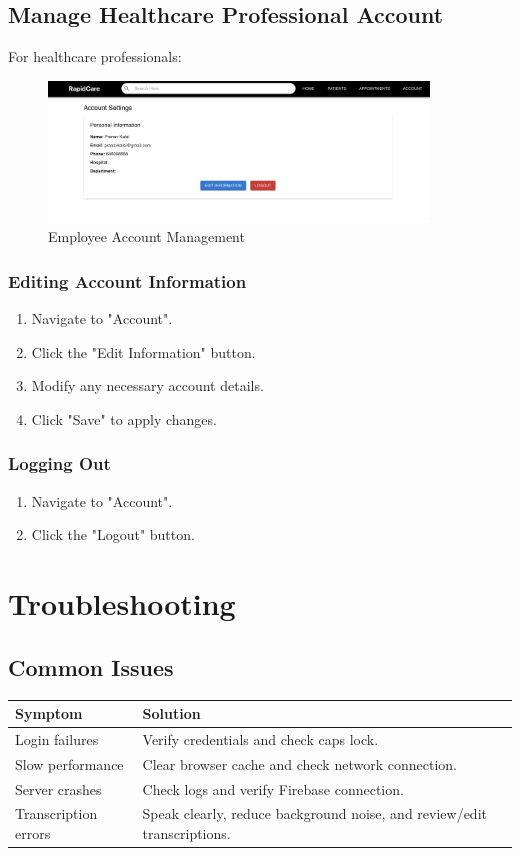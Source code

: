 \documentclass[12pt, titlepage]{article}
\begin{document}
\subsection{Manage Healthcare Professional Account}
For healthcare professionals:

\begin{figure}[H]
\centering
\includegraphics[width=0.9\textwidth]{employee_account.png}
\caption{Employee Account Management}
\label{fig:Employee Account Management}
\end{figure}

\subsubsection{Editing Account Information}
\begin{enumerate}
    \item Navigate to "Account".
    \item Click the "Edit Information" button.
    \item Modify any necessary account details.
    \item Click "Save" to apply changes.
\end{enumerate}

\subsubsection{Logging Out}
\begin{enumerate}
    \item Navigate to "Account".
    \item Click the "Logout" button.
\end{enumerate}

\section{Troubleshooting}
\subsection{Common Issues}
\begin{longtable}{p{}p{}}
\toprule
\textbf{Symptom} & \textbf{Solution} \\
\midrule
Login failures & Verify credentials and check caps lock. \\ 
Slow performance & Clear browser cache and check network connection. \\ 
Server crashes & Check logs and verify Firebase connection. \\ 
Transcription errors & Speak clearly, reduce background noise, and review/edit transcriptions. \\ 
\bottomrule
\end{longtable}
\end{document}
